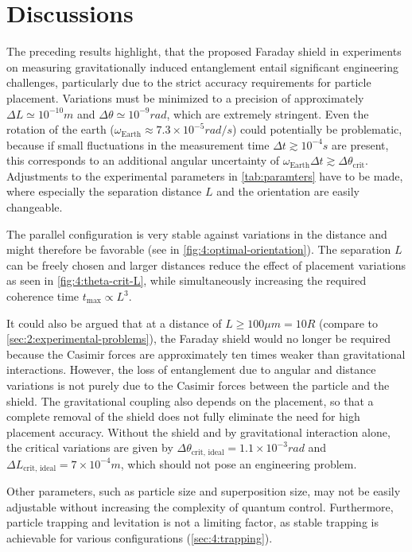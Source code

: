 \section{Discussions}\label{sec:4:discussion}
The preceding results highlight, that the proposed Faraday shield in experiments on measuring gravitationally induced entanglement entail significant engineering challenges, particularly due to the strict accuracy requirements for particle placement.
Variations must be minimized to a precision of approximately $\Delta L \simeq 10^{-10}\si{m}$ and $\Delta \theta \simeq 10^{-9}\si{rad}$, which are extremely stringent.
Even the rotation of the earth ($\omega_\mathrm{Earth}\approx 7.3\times 10^{-5}\si{rad/s}$) could potentially be problematic, because if small fluctuations in the measurement time $\Delta t \gtrsim 10^{-4}\si{s}$ are present, this corresponds to an additional angular uncertainty of $\omega_\mathrm{Earth}\Delta t \gtrsim \Delta \theta_\mathrm{crit}$.
Adjustments to the experimental parameters in \cref{tab:paramters} have to be made, where especially the separation distance $L$ and the orientation are easily changeable.

The parallel configuration is very stable against variations in the distance and might therefore be favorable (see in \cref{fig:4:optimal-orientation}).
The separation $L$ can be freely chosen and larger distances reduce the effect of placement variations as seen in \cref{fig:4:theta-crit-L}, while simultaneously increasing the required coherence time $t_\mathrm{max} \propto L^3$.

It could also be argued that at a distance of $L \geq 100\si{\mu m} = 10 R$ (compare to \cref{sec:2:experimental-problems}), the Faraday shield would no longer be required because the Casimir forces are approximately ten times weaker than gravitational interactions.
However, the loss of entanglement due to angular and distance variations is not purely due to the Casimir forces between the particle and the shield.
The gravitational coupling also depends on the placement, so that a complete removal of the shield does not fully eliminate the need for high placement accuracy.
Without the shield and by gravitational interaction alone, the critical variations are given by $\Delta \theta_\mathrm{crit,\,ideal} = 1.1 \times 10^{-3}\si{rad}$ and $\Delta L_\mathrm{crit,\,ideal} = 7\times 10^{-4}\si{m}$, which should not pose an engineering problem.

Other parameters, such as particle size and superposition size, may not be easily adjustable without increasing the complexity of quantum control.
Furthermore, particle trapping and levitation is not a limiting factor, as stable trapping is achievable for various configurations (\cref{sec:4:trapping}).

